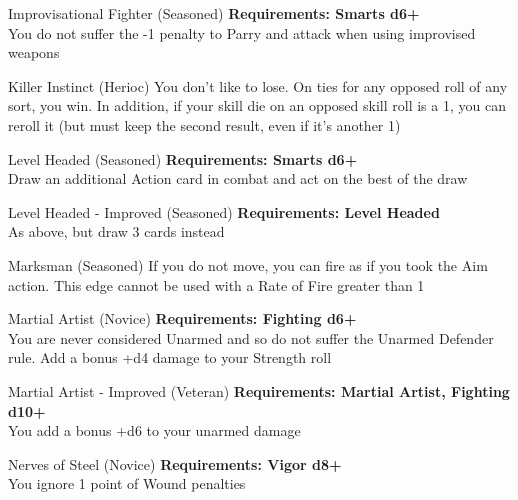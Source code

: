 \begin{multicols}{2}
\begin{genericsection}{Improvisational Fighter (Seasoned)}
\textbf{Requirements: Smarts d6+}\\
You do not suffer the -1 penalty to Parry and attack when using improvised weapons
\end{genericsection}

\begin{genericsection}{Killer Instinct (Herioc)}
You don’t like to lose. On ties for any opposed roll of any sort, you win. In addition, if your skill die on an opposed skill roll is a 1, you can reroll it (but must keep the second result, even if it’s another 1)
\end{genericsection}

\begin{genericsection}{Level Headed (Seasoned)}
\textbf{Requirements: Smarts d6+}\\
Draw an additional Action card in combat and act on the best of the draw
\end{genericsection}

\begin{genericsection}{Level Headed - Improved (Seasoned)}
\textbf{Requirements: Level Headed}\\
As above, but draw 3 cards instead
\end{genericsection}

\begin{genericsection}{Marksman (Seasoned)}
If you do not move, you can fire as if you took the Aim action. This edge cannot be used with a Rate of Fire greater than 1
\end{genericsection}

\begin{genericsection}{Martial Artist (Novice)}
\textbf{Requirements: Fighting d6+}\\
You are never considered Unarmed and so do not suffer the Unarmed Defender rule. Add a bonus +d4 damage to your Strength roll
\end{genericsection}

\begin{genericsection}{Martial Artist - Improved (Veteran)}
\textbf{Requirements: Martial Artist, Fighting d10+}\\
You add a bonus +d6 to your unarmed damage
\end{genericsection}

\begin{genericsection}{Nerves of Steel (Novice)}
\textbf{Requirements: Vigor d8+}\\
You ignore 1 point of Wound penalties
\end{genericsection}


\end{multicols}
